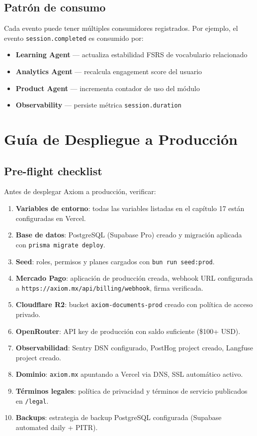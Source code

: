 \section{Patrón de consumo}
Cada evento puede tener múltiples consumidores registrados. Por ejemplo, el evento \texttt{session.completed} es consumido por:

\begin{itemize}[leftmargin=1.4em]
\item \textbf{Learning Agent} — actualiza estabilidad FSRS de vocabulario relacionado
\item \textbf{Analytics Agent} — recalcula engagement score del usuario
\item \textbf{Product Agent} — incrementa contador de uso del módulo
\item \textbf{Observability} — persiste métrica \texttt{session.duration}
\end{itemize}

\chapter{Guía de Despliegue a Producción}
\label{app:deployment-guide}

\section{Pre-flight checklist}
Antes de desplegar Axiom a producción, verificar:

\begin{enumerate}[leftmargin=1.6em]
\item \textbf{Variables de entorno}: todas las variables listadas en el capítulo 17 están configuradas en Vercel.
\item \textbf{Base de datos}: PostgreSQL (Supabase Pro) creado y migración aplicada con \texttt{prisma migrate deploy}.
\item \textbf{Seed}: roles, permisos y planes cargados con \texttt{bun run seed:prod}.
\item \textbf{Mercado Pago}: aplicación de producción creada, webhook URL configurada a \texttt{https://axiom.mx/api/billing/webhook}, firma verificada.
\item \textbf{Cloudflare R2}: bucket \texttt{axiom-documents-prod} creado con política de acceso privado.
\item \textbf{OpenRouter}: API key de producción con saldo suficiente (\$100+ USD).
\item \textbf{Observabilidad}: Sentry DSN configurado, PostHog project creado, Langfuse project creado.
\item \textbf{Dominio}: \texttt{axiom.mx} apuntando a Vercel via DNS, SSL automático activo.
\item \textbf{Términos legales}: política de privacidad y términos de servicio publicados en \texttt{/legal}.
\item \textbf{Backups}: estrategia de backup PostgreSQL configurada (Supabase automated daily + PITR).
\end{enumerate}

